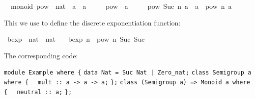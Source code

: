 \begin{isabellebody}
%
\isadelimquote
%
\endisadelimquote
%
\isatagquote
{}\isamarkupfalse%
\ {\isacharparenleft}\ monoid{\isacharparenright}\ pow\ {\isacharcolon}{\isacharcolon}\ {\isachardoublequoteopen}nat\ {\isasymRightarrow}\ {\isacharprime}a\ {\isasymRightarrow}\ {\isacharprime}a{\isachardoublequoteclose}\ \isanewline
\ \ \ \ {\isachardoublequoteopen}pow\ {}\ a\ {\isacharequal}\ {\isasymone}{\isachardoublequoteclose}\isanewline
\ \ {\isacharbar}\ {\isachardoublequoteopen}pow\ {\isacharparenleft}Suc\ n{\isacharparenright}\ a\ {\isacharequal}\ a\ {\isasymotimes}\ pow\ n\ a{\isachardoublequoteclose}%
\endisatagquote
{\isafoldquote}%
%
\isadelimquote
%
\endisadelimquote
%
\begin{isamarkuptext}%
\noindent This we use to define the discrete exponentiation function:%
\end{isamarkuptext}%
\isamarkuptrue%
%
\isadelimquote
%
\endisadelimquote
%
\isatagquote
{}\isamarkupfalse%
\ bexp\ {\isacharcolon}{\isacharcolon}\ {\isachardoublequoteopen}nat\ {\isasymRightarrow}\ nat{\isachardoublequoteclose}\ \isanewline
\ \ {\isachardoublequoteopen}bexp\ n\ {\isacharequal}\ pow\ n\ {\isacharparenleft}Suc\ {\isacharparenleft}Suc\ {}{\isacharparenright}{\isacharparenright}{\isachardoublequoteclose}%
\endisatagquote
{\isafoldquote}%
%
\isadelimquote
%
\endisadelimquote
%
\begin{isamarkuptext}%
\noindent The corresponding code:%
\end{isamarkuptext}%
\isamarkuptrue%
%
\isadelimquote
%
\endisadelimquote
%
\isatagquote
%
\begin{isamarkuptext}%
\isaverbatim%
\noindent%
\verb|module Example where {|\newline%
\newline%
\newline%
\verb|data Nat = Suc Nat |\verb,|,\verb| Zero_nat;|\newline%
\newline%
\verb|class Semigroup a where {|\newline%
\verb|  mult :: a -> a -> a;|\newline%
\verb|};|\newline%
\newline%
\verb|class (Semigroup a) => Monoid a where {|\newline%
\verb|  neutral :: a;|\newline%
\verb|};|\newline%
\newline%

\end{isamarkuptext}
\end{isabellebody}
